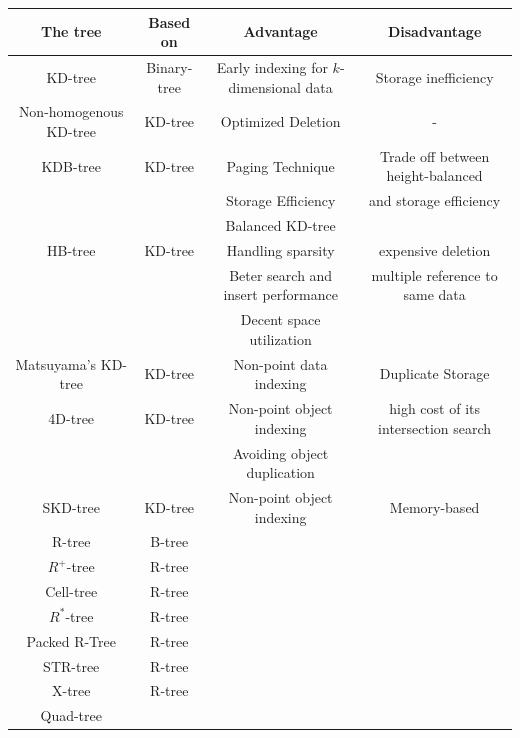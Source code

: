 \documentclass[a4paper,12pt]{article}
\begin{document}


\newpage
\begin{tabular}{|  c | c | c | c |}
\hline
The tree & Based on & Advantage & Disadvantage \\\hline
KD-tree & Binary-tree & Early indexing for $k$-dimensional data & Storage inefficiency \\\hline
Non-homogenous KD-tree & KD-tree & Optimized Deletion & - \\\hline
KDB-tree & KD-tree & Paging Technique & Trade off between height-balanced   \\
               &             &  Storage Efficiency & and storage efficiency   \\
               &             & Balanced KD-tree   &                                       \\\hline
HB-tree & KD-tree & Handling sparsity & expensive deletion \\  
             &              & Beter search and insert performance &multiple reference to same data \\
             &               & Decent space utilization & \\\hline
Matsuyama's KD-tree & KD-tree & Non-point data indexing & Duplicate Storage \\\hline
4D-tree & KD-tree & Non-point object indexing & high cost of its intersection search \\
             &              &    Avoiding object duplication &            \\\hline
SKD-tree & KD-tree & Non-point object indexing & Memory-based \\\hline
R-tree & B-tree & & \\\hline
$R^+$-tree & R-tree &&\\\hline
Cell-tree & R-tree & & \\\hline
$R^*$-tree & R-tree & & \\\hline
Packed R-Tree & R-tree & & \\\hline
STR-tree & R-tree & & \\\hline
X-tree & R-tree & & \\\hline
Quad-tree & & &\\\hline
\end{tabular}

\newpage
\end{document}
